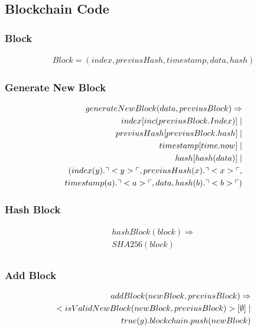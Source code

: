 \subsection{Blockchain Code}

\subsubsection{Block}
\begin{align*}
    Block = (index, previusHash, timestamp, data, hash)
\end{align*}

\subsubsection{Generate New Block}

\begin{align*}
    generateNewBlock(data, previusBlock)\Rightarrow \\
    index[inc(previusBlock.Index)]\mid\\
    previusHash[previusBlock.hash] \mid \\
    timestamp[time.now] \mid \\
    hash[hash(data)] \mid \\
    (index(y).\urcorner <y> \ulcorner, previusHash(x).\urcorner <x> \ulcorner,\\ timestamp(a).\urcorner <a> \ulcorner, data, hash(b).\urcorner <b> \ulcorner)
\end{align*}

\subsubsection{Hash Block}

\begin{align*}
    hashBlock(block)\Rightarrow\\
    SHA256(block)\\
\end{align*}

\subsubsection{Add Block}

\begin{align*}
    addBlock(newBlock, previusBlock) \Rightarrow\\
    <isValidNewBlock(newBlock, previusBlock)>[\mathbf{\emptyset}]\mid \\
    true(y).blockchain.push(newBlock)
\end{align*}

